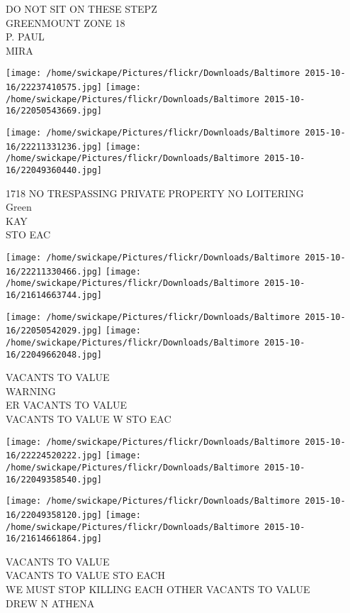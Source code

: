 \documentclass[10pt,letterpaper]{article}
\begin{document}
DO NOT SIT ON THESE STEPZ\\
GREENMOUNT ZONE 18\\
P. PAUL\\
MIRA
\pagebreak

\texttt{[image: /home/swickape/Pictures/flickr/Downloads/Baltimore 2015-10-16/22237410575.jpg]}
\texttt{[image: /home/swickape/Pictures/flickr/Downloads/Baltimore 2015-10-16/22050543669.jpg]}

\texttt{[image: /home/swickape/Pictures/flickr/Downloads/Baltimore 2015-10-16/22211331236.jpg]}
\texttt{[image: /home/swickape/Pictures/flickr/Downloads/Baltimore 2015-10-16/22049360440.jpg]}

1718 NO TRESPASSING PRIVATE PROPERTY NO LOITERING\\
Green\\
KAY\\
STO EAC
\pagebreak

\texttt{[image: /home/swickape/Pictures/flickr/Downloads/Baltimore 2015-10-16/22211330466.jpg]}
\texttt{[image: /home/swickape/Pictures/flickr/Downloads/Baltimore 2015-10-16/21614663744.jpg]}

\texttt{[image: /home/swickape/Pictures/flickr/Downloads/Baltimore 2015-10-16/22050542029.jpg]}
\texttt{[image: /home/swickape/Pictures/flickr/Downloads/Baltimore 2015-10-16/22049662048.jpg]}

VACANTS TO VALUE\\
WARNING\\
ER VACANTS TO VALUE\\
VACANTS TO VALUE W STO EAC
\pagebreak

\texttt{[image: /home/swickape/Pictures/flickr/Downloads/Baltimore 2015-10-16/22224520222.jpg]}
\texttt{[image: /home/swickape/Pictures/flickr/Downloads/Baltimore 2015-10-16/22049358540.jpg]}

\texttt{[image: /home/swickape/Pictures/flickr/Downloads/Baltimore 2015-10-16/22049358120.jpg]}
\texttt{[image: /home/swickape/Pictures/flickr/Downloads/Baltimore 2015-10-16/21614661864.jpg]}

VACANTS TO VALUE\\
VACANTS TO VALUE STO EACH\\
WE MUST STOP KILLING EACH OTHER VACANTS TO VALUE\\
DREW N ATHENA
\pagebreak
\end{document}
